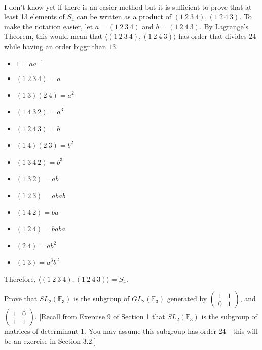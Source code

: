 \begin{solution}
    \\ I don't know yet if there is an easier method but it is sufficient to prove that at least 13 elements of $S_4$ can be written as a product of $(1 \ 2 \ 3 \ 4), (1 \ 2 \ 4 \ 3)$. To make the notation easier, let $a = (1 \ 2 \ 3 \ 4)$ and $b = (1 \ 2 \ 4 \ 3)$. By Lagrange's Theorem, this would mean that $\langle (1 \ 2 \ 3 \ 4), (1 \ 2 \ 4 \ 3) \rangle$ has order that divides $24$ while having an order biggr than $13$.
    \begin{multicols}{3}
    \begin{itemize}
        \item $1 = a a^{-1}$
        \item $(1 \ 2 \ 3 \ 4) = a$
        \item $(1 \ 3)(2 \ 4) = a^2$
        \item $(1 \ 4 \ 3 \ 2) = a^3$
        \item $(1 \ 2 \ 4 \ 3) = b$
        \item $(1 \ 4)(2 \ 3) = b^2$
        \item $(1 \ 3 \ 4 \ 2) = b^3$
        \item $(1 \ 3 \ 2) = ab$
        \item $(1 \ 2 \ 3) = abab$
        \item $(1 \ 4 \ 2) = ba$
        \item $(1 \ 2 \ 4) = baba$
        \item $(2 \ 4) = ab^2$
        \item $(1 \ 3) = a^3b^2$
    \end{itemize}
    \end{multicols}
    \noindent Therefore, $\langle (1 \ 2 \ 3 \ 4), (1 \ 2 \ 4 \ 3) \rangle = S_4$. \\
\end{solution}

\begin{exercise}
    Prove that $SL_2(\mathbb{F}_3)$ is the subgroup of $GL_2(\mathbb{F}_3)$ generated by $\begin{pmatrix}
        1 & 1\\ 
        0 & 1
      \end{pmatrix}$, and 
    $\begin{pmatrix}
        1 & 0\\ 
        1 & 1
    \end{pmatrix}$. [Recall from Exercise 9 of Section 1 that $SL_2(\mathbb{F}_3)$ is the subgroup of matrices of determinant 1. You may assume this subgroup has order 24 - this will be an exercise in Section 3.2.] \\
\end{exercise}

